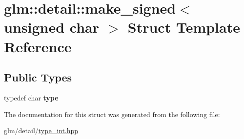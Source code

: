 \hypertarget{structglm_1_1detail_1_1make__signed_3_01unsigned_01char_01_4}{\section{glm\-:\-:detail\-:\-:make\-\_\-signed$<$ unsigned char $>$ Struct Template Reference}
\label{structglm_1_1detail_1_1make__signed_3_01unsigned_01char_01_4}
}
\subsection*{Public Types}
\begin{DoxyCompactItemize}
\item 
\hypertarget{structglm_1_1detail_1_1make__signed_3_01unsigned_01char_01_4_a38e3001baf7964626c6e7dff83b4ba95}{typedef char {\bfseries type}}\label{structglm_1_1detail_1_1make__signed_3_01unsigned_01char_01_4_a38e3001baf7964626c6e7dff83b4ba95}

\end{DoxyCompactItemize}


The documentation for this struct was generated from the following file\-:\begin{DoxyCompactItemize}
\item 
glm/detail/\hyperlink{type__int_8hpp}{type\-\_\-int.\-hpp}\end{DoxyCompactItemize}
